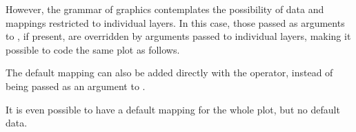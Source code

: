 \documentclass[krantz2]{krantz}\usepackage{knitr}
\begin{document}
\begin{knitrout}\footnotesize
{}\color{fgcolor}\begin{kframe}
\begin{alltt}
\hlstd{(} 
        \hlstd{=} \hlstd{(}    \hlopt{+}
  \hlstd{()}
\end{alltt}
\end{kframe}
\end{knitrout}

However, the grammar of graphics contemplates the possibility of data and mappings restricted to individual layers. In this case, those passed as arguments to , if present,  are overridden by arguments passed to individual layers, making it possible to code the same plot as follows.

\begin{knitrout}\footnotesize
{}\color{fgcolor}\begin{kframe}
\begin{alltt}
\hlstd{()} \hlopt{+}
  \hlstd{(} 
              \hlstd{=} \hlstd{(}   
\end{alltt}
\end{kframe}
\end{knitrout}

The default mapping can also be added directly with the \code{+} operator, instead of being passed as an argument to .

\begin{knitrout}\footnotesize
{}\color{fgcolor}\begin{kframe}
\begin{alltt}
\hlstd{(}  \hlopt{+}
  \hlstd{(}    \hlopt{+}
  \hlstd{()}
\end{alltt}
\end{kframe}
\end{knitrout}

It is even possible to have a default mapping for the whole plot, but no default data.

\begin{knitrout}\footnotesize
{}\color{fgcolor}\begin{kframe}
\begin{alltt}
\hlstd{()} \hlopt{+}
  \hlstd{(}    \hlopt{+}
  \hlstd{(} 
\end{alltt}
\end{kframe}
\end{knitrout}
\end{document}
